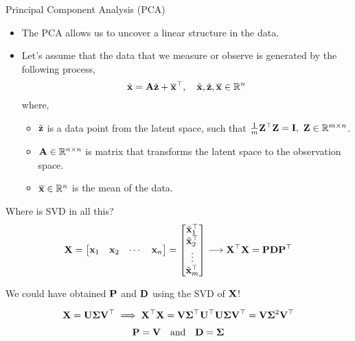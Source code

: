 \documentclass[aspectratio=169]{beamer}
\let\olditem\item
\renewcommand{\item}{\setlength{\itemsep}{\fill}\olditem}
\def\mf{\ensuremath\mathbf}
\def\mb{\ensuremath\mathbb}
\def\emx{\ensuremath\end{bmatrix*}}
\def\bmxc{\ensuremath\begin{bmatrix*}[c]}
\begin{document}
\begin{frame}[t]{Principal Component Analysis (PCA)}
\begin{itemize}
  \item The PCA allows us to uncover a linear structure in the data. 
  
  \item Let's assume that the data that we measure or observe is generated by the following process,
  \[ \tilde{\mf{x}} = \mf{A} \tilde{\mf{z}} + \overline{\mf{x}}^\top, \quad \tilde{\mf{x}}, \tilde{\mf{z}}, \overline{\mf{x}} \in \mb{R}^n \]
  where, 
  \begin{itemize}
    \item $\tilde{\mf{z}}$ is a data point from the latent space, such that $\frac{1}{m}\mf{Z}^\top\mf{Z} = \mf{I}, \,\, \mf{Z} \in \mb{R}^{m \times n}$.
    \item $\mf{A} \in \mb{R}^{n \times n}$ is matrix that transforms the latent space to the observation space.
    \item $\overline{\mf{x}} \in \mb{R}^n$ is the mean of the data.
  \end{itemize}
\end{itemize}
\end{frame}


\begin{frame}[t]{Where is SVD in all this?}
  \[ \mf{X} = \bmxc \mf{x}_{1} & \mf{x}_{2} & \cdots & \mf{x}_n \emx = \bmxc \tilde{\mf{x}}_{1}^\top \\ \tilde{\mf{x}}_{2}^\top \\ \vdots \\ \tilde{\mf{x}}_{m}^\top \emx \longrightarrow \mf{X}^\top\mf{X} = \mf{P}\mf{D}\mf{P}^\top \]

  We could have obtained $\mf{P}$ and $\mf{D}$ using the SVD of $\mf{X}$!

  \[ \mf{X} = \mf{U}\bm{\Sigma}\mf{V}^\top \implies \mf{X}^\top\mf{X} = \mf{V}\bm{\Sigma}^\top\mf{U}^\top\mf{U}\bm{\Sigma}\mf{V}^\top = \mf{V}\bm{\Sigma}^2\mf{V}^\top \]

  \[ \mf{P} = \mf{V} \quad \text{and} \quad \mf{D} = \bm{\Sigma} \]
\end{frame}
\end{document}
